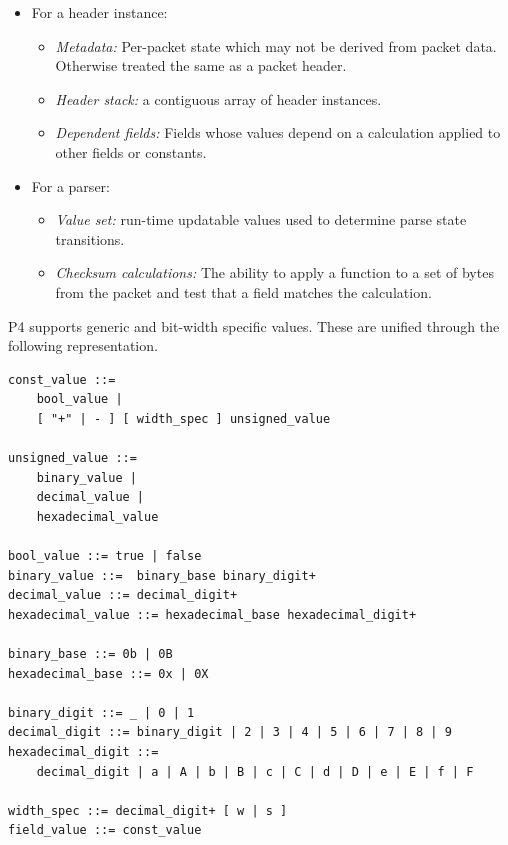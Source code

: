 \documentclass[12pt]{article}
\begin{document}
\begin{itemize}

\item
For a header instance:
\begin{itemize}
\item
\textit{Metadata:} Per-packet state which may not be derived from
packet data. Otherwise treated the same as a packet header.
\item
\textit{Header stack:} a contiguous array of header instances.
\item
\textit{Dependent fields:} Fields whose values depend on a calculation
applied to other fields or constants.
\end{itemize}

\item
For a parser:
\begin{itemize}
\item
\textit{Value set:} run-time updatable values used to determine parse
state transitions.
\item
\textit{Checksum calculations:} The ability to apply a function to a
set of bytes from the packet and test that a field matches the
calculation.
\end{itemize}

\end{itemize}



P4 supports generic and bit-width specific values. These are unified through
the following representation.

\begin{lstlisting}[style=BNFstyle]
const_value ::=
    bool_value |
    [ "+" | - ] [ width_spec ] unsigned_value

unsigned_value ::= 
    binary_value | 
    decimal_value | 
    hexadecimal_value

bool_value ::= true | false
binary_value ::=  binary_base binary_digit+
decimal_value ::= decimal_digit+
hexadecimal_value ::= hexadecimal_base hexadecimal_digit+

binary_base ::= 0b | 0B
hexadecimal_base ::= 0x | 0X

binary_digit ::= _ | 0 | 1
decimal_digit ::= binary_digit | 2 | 3 | 4 | 5 | 6 | 7 | 8 | 9
hexadecimal_digit ::= 
    decimal_digit | a | A | b | B | c | C | d | D | e | E | f | F

width_spec ::= decimal_digit+ [ w | s ]
field_value ::= const_value
\end{lstlisting}
\end{document}
